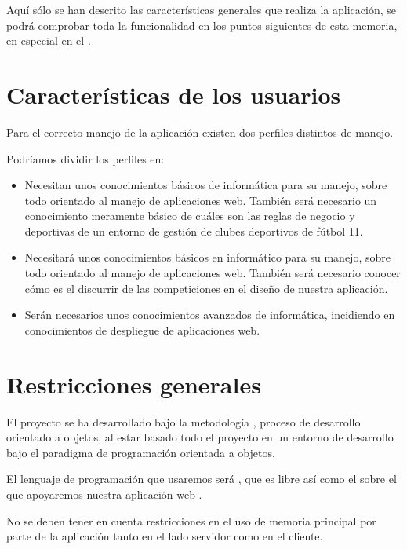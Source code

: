 Aquí sólo se han descrito las características generales que realiza la
aplicación, se podrá comprobar toda la funcionalidad en los puntos siguientes de
esta memoria, en especial en el .

\section{Características de los usuarios}

Para el correcto manejo de la aplicación 
existen dos perfiles distintos de manejo.

Podríamos dividir los perfiles en:

\begin{itemize}
\item {} Necesitan unos conocimientos básicos de
  informática para su manejo, sobre todo orientado al manejo de aplicaciones
  web. También será necesario un conocimiento meramente básico de cuáles son las
  reglas de negocio y deportivas de un entorno de gestión de clubes deportivos
  de fútbol 11.
\item {} Necesitará unos conocimientos básicos
  en informático para su manejo, sobre todo orientado al manejo de aplicaciones
  web. También será necesario conocer cómo es el discurrir de las competiciones
  en el diseño de nuestra aplicación.
\item {} Serán necesarios unos
  conocimientos avanzados de informática, incidiendo en conocimientos de
  despliegue de aplicaciones web.
\end{itemize}

\section{Restricciones generales}
\label{sec:restricciones_generales}
El proyecto se ha desarrollado bajo la metodología , proceso de desarrollo orientado a objetos, al estar basado
todo el proyecto en un entorno de desarrollo bajo el paradigma de programación
orientada a objetos.

El lenguaje de programación que usaremos será , que es libre así
como el  sobre el que apoyaremos nuestra aplicación web
.

No se deben tener en cuenta restricciones en el uso de memoria principal por
parte de la aplicación tanto en el lado servidor como en el cliente.

